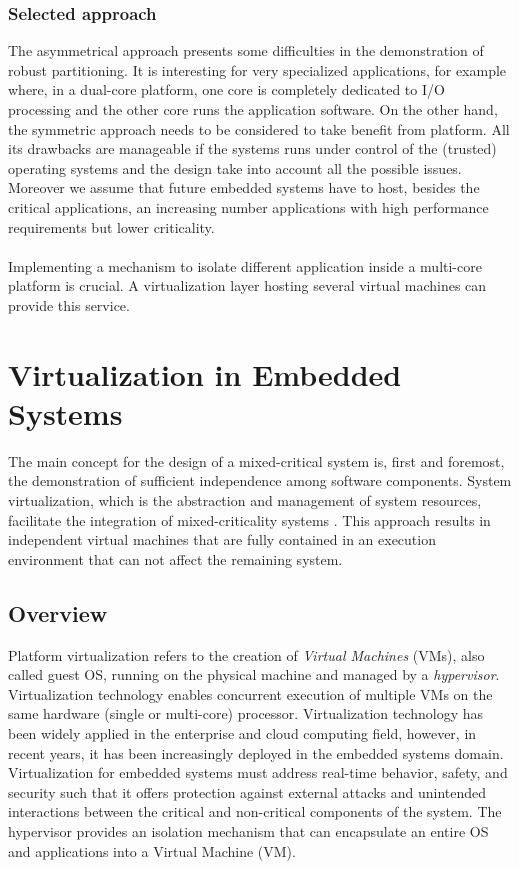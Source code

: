 \subsubsection{Selected approach}
The asymmetrical approach presents some difficulties in the demonstration of robust partitioning. It is interesting for very specialized applications, for example where, in a dual-core platform, one core is completely dedicated to I/O processing and the other core runs the application software. On the other hand, the symmetric approach needs to be considered to take benefit from platform. All its drawbacks  are manageable if the systems runs under control of the (trusted) operating systems and the design take into account all the possible issues. Moreover we assume that future embedded systems have to host, besides the critical applications, an increasing number applications with high performance requirements but lower criticality.

\paragraph{} Implementing a mechanism to isolate different application inside a multi-core platform is crucial. A virtualization layer hosting several virtual machines can provide this service.

\section{Virtualization in Embedded Systems}
The main concept for the design of a mixed-critical system is, first and foremost, the demonstration of sufficient independence among software components. System virtualization, which is the abstraction and management of system resources, facilitate the integration of mixed-criticality systems \cite{multipartes}. This approach results in independent virtual machines that are fully contained in an execution environment that can not affect the remaining system. 

\subsection{Overview}
Platform virtualization refers to the creation of \emph{Virtual Machines} (VMs), also called guest OS, running on the physical machine and managed by a \emph{hypervisor}. Virtualization technology enables concurrent execution of multiple VMs on the same hardware (single or multi-core) processor. Virtualization technology has been widely applied in the enterprise and cloud computing field, however, in recent years, it has been increasingly deployed in the embedded systems domain. Virtualization for embedded systems must address real-time behavior, safety, and security such that it offers protection against external attacks and unintended
interactions between the critical and non-critical components of the system. The hypervisor provides an isolation mechanism that can encapsulate an entire OS and applications into a Virtual Machine (VM).

